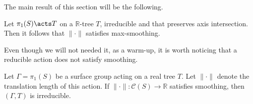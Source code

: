 The main result of this section will be the following.

\begin{theorem}
Let $\pi_1(S) \acts T$ on a $\mathbb{R}$-tree $T$, irreducible and that preserves axis intersection. Then it follows that $\| \cdot \|$ satisfies max-smoothing.
\label{prop:small}
\end{theorem}

Even though we will not needed it, as a warm-up, it is worth noticing that a reducible action does not satisfy smoothing.

\begin{lemma}
Let $\Gamma=\pi_1(S)$ be a surface group acting on a real tree $T$. Let $\| \cdot \|$ denote the translation length of this action.
If $\| \cdot \| \colon \mathcal{C}(S) \to \mathbb{R}$ satisfies smoothing, then $(\Gamma, T)$ is irreducible.
\end{lemma}
